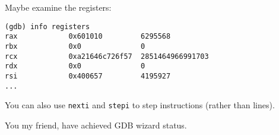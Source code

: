 \documentclass[11pt]{article}
\begin{document}
Maybe examine the registers:
\begin{termbox}
\begin{verbatim}
(gdb) info registers
rax            0x601010         6295568
rbx            0x0              0
rcx            0xa21646c726f57  2851464966991703
rdx            0x0              0
rsi            0x400657         4195927
...
\end{verbatim}
\end{termbox}

You can also use \texttt{nexti} and \texttt{stepi} to step instructions (rather
than lines).

You my friend, have achieved GDB wizard status.
\end{document}

